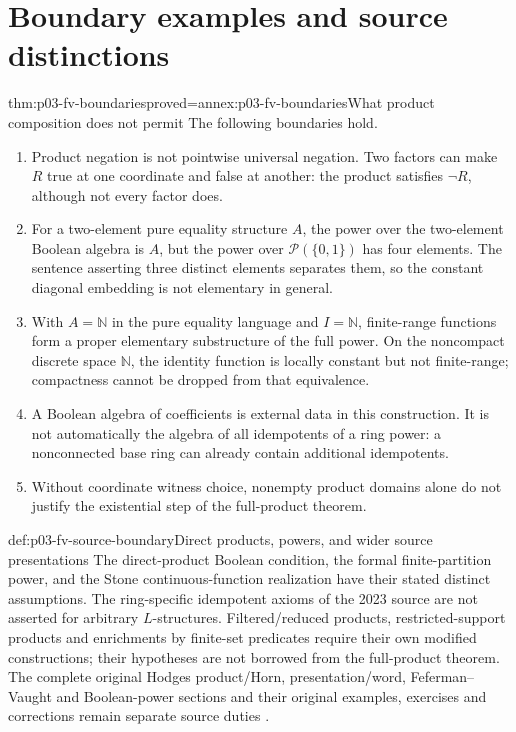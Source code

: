 \section{Boundary examples and source distinctions}

\begin{hbtheorem}{thm:p03-fv-boundaries}{proved=annex:p03-fv-boundaries}{What product composition does not permit}
The following boundaries hold.
\begin{enumerate}
\item Product negation is not pointwise universal negation. Two factors can
      make \(R\) true at one coordinate and false at another: the product
      satisfies \(\neg R\), although not every factor does.
\item For a two-element pure equality structure \(A\), the power over
      the two-element Boolean algebra is \(A\), but the power over
      \(\mathcal P(\{0,1\})\) has four elements. The sentence asserting
      three distinct elements separates them, so the constant diagonal
      embedding is not elementary in general.
\item With \(A=\mathbb N\) in the pure equality language and
      \(I=\mathbb N\), finite-range functions form a proper elementary
      substructure of the full power. On the noncompact discrete space
      \(\mathbb N\), the identity function is locally constant but not
      finite-range; compactness cannot be dropped from that equivalence.
\item A Boolean algebra of coefficients is external data in this construction.
      It is not automatically the algebra of all idempotents of a ring power:
      a nonconnected base ring can already contain additional idempotents.
\item Without coordinate witness choice, nonempty product domains alone
      do not justify the existential step of the full-product theorem.
\end{enumerate}
\end{hbtheorem}

\begin{proofboundary}{def:p03-fv-source-boundary}{Direct products, powers, and wider source presentations}
The direct-product Boolean condition, the formal finite-partition power,
and the Stone continuous-function realization have their stated distinct
assumptions. The ring-specific idempotent axioms of the 2023 source are not
asserted for arbitrary \(L\)-structures. Filtered/reduced products,
restricted-support products and enrichments by finite-set predicates require
their own modified constructions; their hypotheses are not borrowed from
the full-product theorem. The complete original Hodges product/Horn,
presentation/word, Feferman--Vaught and Boolean-power sections and their
original examples, exercises and corrections remain separate source duties
\cite[Chapter~9]{Hodges1993}.
\end{proofboundary}
